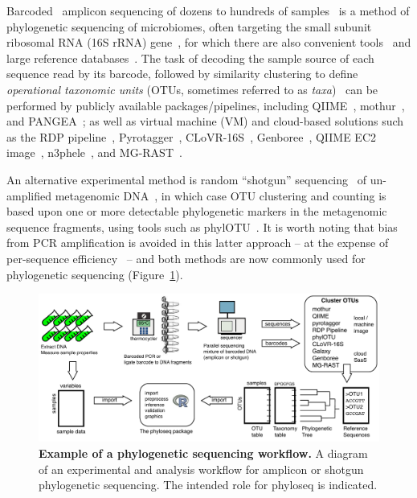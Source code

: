 \documentclass[10pt]{article}\usepackage{graphicx, color}
\begin{document}
Barcoded~\cite{Hamady:2008iu} amplicon sequencing 
of dozens to hundreds of samples~\cite{Liu:2008bi}
is a method of phylogenetic sequencing of microbiomes,
often targeting the small subunit ribosomal RNA (16S rRNA) gene~\cite{Pace:1997tl},
for which there are also convenient tools~\cite{DeSantis:2006kj} 
and large reference databases~\cite{greengenes,Cole:2009dm,Pruesse:2007jc}.
The task of decoding the sample source of each sequence read by its barcode,
followed by similarity clustering to define \emph{operational taxonomic units} (OTUs, sometimes referred to as \emph{taxa})~\cite{Li:2006hr,Huang:2010jb}
can be performed by publicly available packages/pipelines,
including
QIIME~\cite{caporaso2010qiime},
mothur~\cite{mothur}, 
and PANGEA~\cite{Giongo:2010bv};
as well as virtual machine (VM) and cloud-based solutions such as 
the RDP pipeline~\cite{Cole:2009dm},
Pyrotagger~\cite{Kunin:2010wd},
CLoVR-16S~\cite{Angiuoli:2011ib}, 
Genboree~\cite{genboree16s}, 
QIIME EC2 image~\cite{qiimeweb},
n3phele~\cite{n3phele}, 
and MG-RAST~\cite{Meyer:2008db}.

An alternative experimental method is random ``shotgun'' sequencing~\cite{Venter05061998,Fleischmann28071995}
of un-amplified metagenomic DNA~\cite{Venter:2004aa},
in which case OTU clustering and counting is based upon
one or more detectable phylogenetic markers
in the metagenomic sequence fragments,
using tools such as phylOTU~\cite{phylOTU}.
It is worth noting that bias from PCR amplification is avoided in this latter approach --
at the expense of per-sequence efficiency~\cite{phylOTU} --
and both methods are now commonly used for phylogenetic sequencing
(Figure~\ref{fig:phyloSeqOverview}). 

\begin{figure}[!htbp]
\begin{center}
\includegraphics[width=5in]{experimental-physeq-overview-graphic.pdf}
\end{center}
\caption{
{\bf Example of a phylogenetic sequencing workflow.}
A diagram of an experimental and analysis workflow 
for amplicon or shotgun phylogenetic sequencing. 
The intended role for phyloseq is indicated.}
\label{fig:phyloSeqOverview}
\end{figure}
\end{document}
